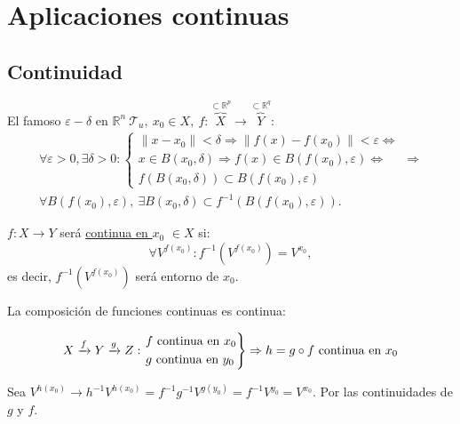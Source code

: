 \chapter{Aplicaciones continuas}%
\label{cha:aplicaciones_continuas}
\section{Continuidad}%
\label{sec:continuidad}
El famoso $\varepsilon-\delta$ en $\mathbb{R}^n\ \mathcal{T}_u,\ x_0 \in X,\ f : \overbrace{X}^{\subset \mathbb{R}^p} \rightarrow \overbrace{Y}^{\subset \mathbb{R}^q}$: 
\begin{gather*}        
\forall \varepsilon > 0, \exists \delta > 0: 
\begin{cases}
    \lVert x - x_0 \rVert < \delta \Rightarrow \lVert f\left( x \right) - f\left( x_0 \right) \rVert < \varepsilon \Leftrightarrow\\
    x \in B\left( x_0, \delta \right) \Rightarrow f\left( x \right) \in B\left( f\left( x_0 \right), \varepsilon \right) \Leftrightarrow\\
    f\left( B\left( x_0, \delta \right) \right) \subset B\left( f\left( x_0 \right), \varepsilon \right) 
\end{cases} \Rightarrow\\
\boxed{\forall B\left( f\left( x_0 \right), \varepsilon \right),\ \exists B\left( x_0, \delta \right) \subset f^{-1}\left( B\left( f\left( x_0 \right), \varepsilon \right) \right)} 
.\end{gather*}

\begin{defi}
$f: X \rightarrow Y$ será \underline{continua en $x_0$} $\in X$ si: 
\[
\forall V^{f\left( x_0 \right)}: f^{-1}\left( V^{f\left( x_0 \right)} \right) = V^{x_0},
\]
es decir, $f^{-1}\left( V^{f\left( x_0 \right)} \right)$ será entorno de $x_0$.
\end{defi}

\begin{prop}
La composición de funciones continuas es continua:

\[
X \xrightarrow{f} Y \xrightarrow{g} Z: \begin{rcases}
    f \text{ continua en } x_0\\
    g \text{ continua en } y_0
\end{rcases} \Rightarrow h = g \circ f \text{ continua en }  x_0
\]
\end{prop}
\begin{demo}
Sea $V^{h\left( x_0 \right)} \rightarrow h^{-1} V^{h\left( x_0 \right)} = f^{-1}g^{-1}V^{g\left( y_0 \right)} = f^{-1} V^{y_0} = V^{x_0}$. Por las continuidades de $g$ y $f$.
\end{demo}

